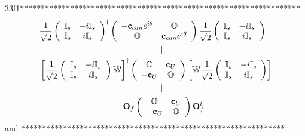\documentclass[aps,preprint]{revtex4}%
\begin{document}
33f1*******************************************************************%
\begin{align*}
&  \frac{1}{\sqrt{2}}\left(
\begin{array}
[c]{cc}%
\mathbb{I}_{s} & -i\mathbb{I}_{s}\\
\mathbb{I}_{s} & i\mathbb{I}_{s}%
\end{array}
\right)  ^{\dagger}\left(
\begin{array}
[c]{cc}%
-\mathbf{c}_{can}e^{i\mathbf{\theta}} & \mathbb{O}\\
\mathbb{O} & \mathbf{c}_{can}e^{i\mathbf{\theta}}%
\end{array}
\right)  \frac{1}{\sqrt{2}}\left(
\begin{array}
[c]{cc}%
\mathbb{I}_{s} & -i\mathbb{I}_{s}\\
\mathbb{I}_{s} & i\mathbb{I}_{s}%
\end{array}
\right) \\
&  \qquad\qquad\qquad\qquad\qquad\qquad\qquad\left.  \parallel\right. \\
&  \left[  \frac{1}{\sqrt{2}}\left(
\begin{array}
[c]{cc}%
\mathbb{I}_{s} & -i\mathbb{I}_{s}\\
\mathbb{I}_{s} & i\mathbb{I}_{s}%
\end{array}
\right)  \mathbb{W}\right]  ^{\dagger}\left(
\begin{array}
[c]{cc}%
\mathbb{O} & \mathbf{c}_{U}\\
-\mathbf{c}_{U} & \mathbb{O}%
\end{array}
\right)  \left[  \mathbb{W}\frac{1}{\sqrt{2}}\left(
\begin{array}
[c]{cc}%
\mathbb{I}_{s} & -i\mathbb{I}_{s}\\
\mathbb{I}_{s} & i\mathbb{I}_{s}%
\end{array}
\right)  \right] \\
&  \qquad\qquad\qquad\qquad\qquad\qquad\qquad\left.  \parallel\right. \\
&  \qquad\qquad\qquad\qquad\qquad\mathbf{O}_{f}\left(
\begin{array}
[c]{cc}%
\mathbb{O} & \mathbf{c}_{U}\\
-\mathbf{c}_{U} & \mathbb{O}%
\end{array}
\right)  \mathbf{O}_{f}^{t}%
\end{align*}
and ***************************************************************%
\end{document}
